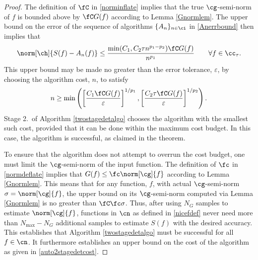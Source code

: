 \documentclass[final]{elsarticle}
\theoremstyle{definition}
\theoremstyle{remark}
\begin{document}
\begin{proof} The definition of $\fC$ in \eqref{norminflate} implies that the true $\cg$-semi-norm of $f$ is bounded above by $\fC G(f)$ according to Lemma \ref{Gnormlem}.  The upper bound on the error of the sequence of algorithms $\{A_n\}_{n \in \ci}$ in \eqref{Anerrbound} then implies that 
\[
\norm[\ch]{S(f) -  A_n(f)} \le \frac{\min(C_1,C_2\tau n^{p_1-p_2})\fC G(f)}{n^{p_1}} \qquad \forall f \in \cc_{\tau}.
\]
This upper bound may be made no greater than the error tolerance, $\varepsilon$, by choosing the algorithm cost, $n$, to satisfy
\[
n \ge \min\left( \left[\frac{C_1 \fC G(f)}{\varepsilon}\right]^{1/p_1}, \left[\frac{C_2 \tau \fC G(f)}{\varepsilon}\right]^{1/p_2} \right ) .
\]
Stage 2.\ of Algorithm \ref{twostagedetalgo} chooses the algorithm with the smallest such cost, provided that it can be done within the maximum cost budget.  In this case, the algorithm is successful, as claimed in the theorem.

To ensure that the algorithm does not attempt to overrun the cost budget, one must limit the $\cg$-semi-norm of the input function.  The definition of  $\fc$ in \eqref{normdeflate} implies that $G(f) \le \fc\norm[\cg]{f}$ according to Lemma \ref{Gnormlem}. This means that for any function, $f$, with actual $\cg$-semi-norm $\sigma=\norm[\cg]{f}$, the upper bound on its $\cg$-semi-norm computed via Lemma \ref{Gnormlem} is no greater than $\fC \fc \sigma$.  Thus, after using $N_G$ samples to estimate $\norm[\cg]{f}$, functions in $\cn$ as defined in \eqref{nicefdef} never need more than $N_{\max} - N_G$ additional samples to estimate $S(f)$ with the desired accuracy.  This establishes that Algorithm \ref{twostagedetalgo} must be successful for all $f \in \cn$.  It furthermore establishes an upper bound on the cost of the algorithm as given in \eqref{auto2stagedetcost}.


\end{proof}
\end{document}
